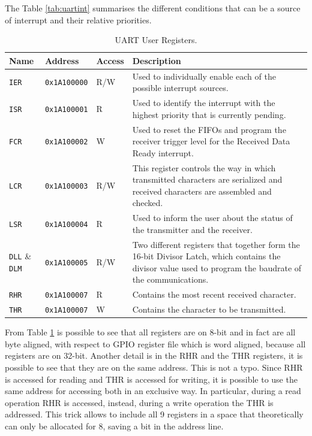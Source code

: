 The Table \ref{tab:uartint} summarises the different conditions that can be a source of interrupt and their relative priorities.
\begin{table}
\centering
\begin{tabular}{| p{2cm} | p{2cm} | p{2cm} | p{7cm} |}
    \hline
    \textbf{Name} & \textbf{Address} & \textbf{Access} & \textbf{Description}\\ \hline
    \texttt{IER} & \texttt{0x1A100000} & R/W & Used to individually enable each of the possible interrupt sources. \\ \hline
    \texttt{ISR} & \texttt{0x1A100001} & R & Used to identify the interrupt with the highest priority that is currently pending. \\ \hline
    \texttt{FCR} & \texttt{0x1A100002} & W & Used to reset the FIFOs and program the receiver trigger level for the Received Data Ready interrupt. \\ \hline
    \texttt{LCR} & \texttt{0x1A100003} & R/W & This register controls the way in which transmitted characters are serialized and received characters are assembled and checked. \\ \hline
    \texttt{LSR} & \texttt{0x1A100004} & R & Used to inform the user about the status of the transmitter and the receiver. \\ \hline
    \texttt{DLL} \& \texttt{DLM} & \texttt{0x1A100005} & R/W & Two different registers that together form the 16-bit Divisor Latch, which contains the divisor value used to program the baudrate of the communications. \\ \hline
    \texttt{RHR} & \texttt{0x1A100007} & R & Contains the most recent received character. \\ \hline
    \texttt{THR} & \texttt{0x1A100007} & W & Contains the character to be transmitted. \\ \hline
    \hline
\end{tabular}
\caption{UART User Registers.}
\label{tab:uart} %
\end{table}
From Table \ref{tab:uart} is possible to see that all registers are on 8-bit and in fact are all byte aligned, with respect to GPIO register file which is word aligned, because all registers are on 32-bit. Another detail is in the RHR and the THR registers, it is possible to see that they are on the same address. This is not a typo. Since RHR is accessed for reading and THR is accessed for writing, it is possible to use the same address for accessing both in an exclusive way. In particular,  during a read operation RHR is accessed, instead, during a write operation the THR is addressed. This trick allows to include all 9 registers in a space that theoretically can only be allocated for 8, saving a bit in the address line.


